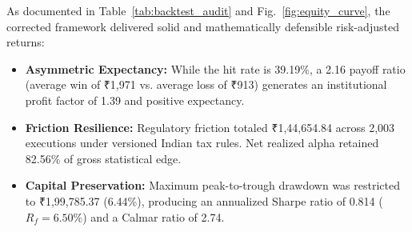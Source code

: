 \documentclass[journal]{IEEEtran}
\begin{document}
As documented in Table~\ref{tab:backtest_audit} and Fig.~\ref{fig:equity_curve}, the corrected framework delivered solid and mathematically defensible risk-adjusted returns:
\begin{itemize}
    \item \textbf{Asymmetric Expectancy:} While the hit rate is 39.19\%, a 2.16 payoff ratio (average win of ₹1,971 vs. average loss of ₹913) generates an institutional profit factor of 1.39 and positive expectancy.
    \item \textbf{Friction Resilience:} Regulatory friction totaled ₹1,44,654.84 across 2{,}003 executions under versioned Indian tax rules. Net realized alpha retained 82.56\% of gross statistical edge.
    \item \textbf{Capital Preservation:} Maximum peak-to-trough drawdown was restricted to ₹1,99,785.37 (6.44\%), producing an annualized Sharpe ratio of 0.814 ($R_f = 6.50\%$) and a Calmar ratio of 2.74.
\end{itemize}
\end{document}
